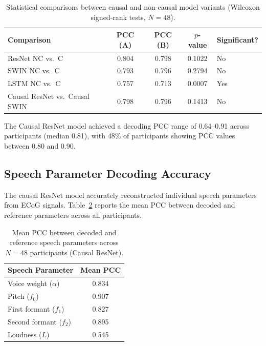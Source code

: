 \documentclass[11pt]{article}
\begin{document}
\begin{table}[H]
\centering
\caption{Statistical comparisons between causal and non-causal model variants (Wilcoxon signed-rank tests, $N=48$).}
\label{tab:causality_tests}
\begin{tabular}{lcccl}
\toprule
\textbf{Comparison} & \textbf{PCC (A)} & \textbf{PCC (B)} & \textbf{$p$-value} & \textbf{Significant?} \\
\midrule
ResNet NC vs.\ C   & 0.804 & 0.798 & 0.1022 & No  \\
SWIN NC vs.\ C     & 0.793 & 0.796 & 0.2794 & No  \\
LSTM NC vs.\ C     & 0.757 & 0.713 & 0.0007 & Yes \\
Causal ResNet vs.\ Causal SWIN & 0.798 & 0.796 & 0.1413 & No  \\
\bottomrule
\end{tabular}
\end{table}

The Causal ResNet model achieved a decoding PCC range of 0.64--0.91 across participants (median 0.81), with 48\% of participants showing PCC values between 0.80 and 0.90.

\subsection{Speech Parameter Decoding Accuracy}

The causal ResNet model accurately reconstructed individual speech parameters from ECoG signals. Table~\ref{tab:speech_params} reports the mean PCC between decoded and reference parameters across all participants.

\begin{table}[H]
\centering
\caption{Mean PCC between decoded and reference speech parameters across $N=48$ participants (Causal ResNet).}
\label{tab:speech_params}
\begin{tabular}{lc}
\toprule
\textbf{Speech Parameter} & \textbf{Mean PCC} \\
\midrule
Voice weight ($\alpha$)      & 0.834 \\
Pitch ($f_0$)                & 0.907 \\
First formant ($f_1$)        & 0.827 \\
Second formant ($f_2$)       & 0.895 \\
Loudness ($L$)               & 0.545 \\
\bottomrule
\end{tabular}
\end{table}
\end{document}
